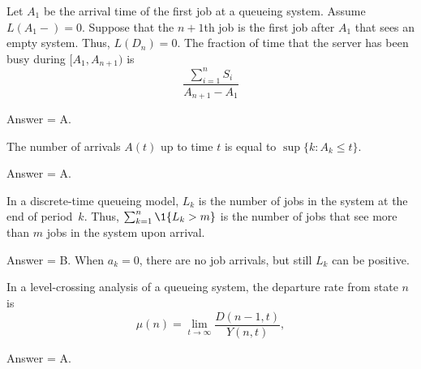 \begin{exercise}[201802]
Let $A_1$ be the arrival time of the first job at a queueing system. Assume $L(A_1-)=0$. Suppose that the $n+1$th job is the first job after $A_1$ that sees an empty system.  Thus,
 $L(D_n)=0$.  The fraction of time that the server has been busy during $[A_1, A_{n+1})$     is
        \begin{equation*}
\frac{\sum_{i=1}^n S_i}{A_{n+1}-A_1} 
        \end{equation*}

\begin{solution}
Answer = A.
\end{solution}
\end{exercise}

\begin{exercise}[201802]
The number of arrivals $A(t)$ up to time $t$ is equal to $\sup\{k : A_k\leq t\}$. 
\begin{solution}
Answer = A.
\end{solution}
\end{exercise}

\begin{exercise}[201802]
In a discrete-time queueing model, $L_k$ is the number of jobs in the system at the end of period~$k$. Thus, $\sum_{k=1}^n \1{L_k > m}$ is  the number of jobs that see more than $m$ jobs in the system upon arrival. 
\begin{solution}
Answer = B. When $a_k=0$, there are no job arrivals, but still $L_k$ can be positive.
\end{solution}
\end{exercise}

\begin{exercise}[201802]
In a level-crossing analysis of a queueing system,  the departure rate from state $n$ is 
\begin{equation*}
  \mu(n) = \lim_{t\to\infty} \frac{D(n-1,t)}{Y(n,t)},
\end{equation*}

\begin{solution}
Answer = A.
\end{solution}
\end{exercise}

